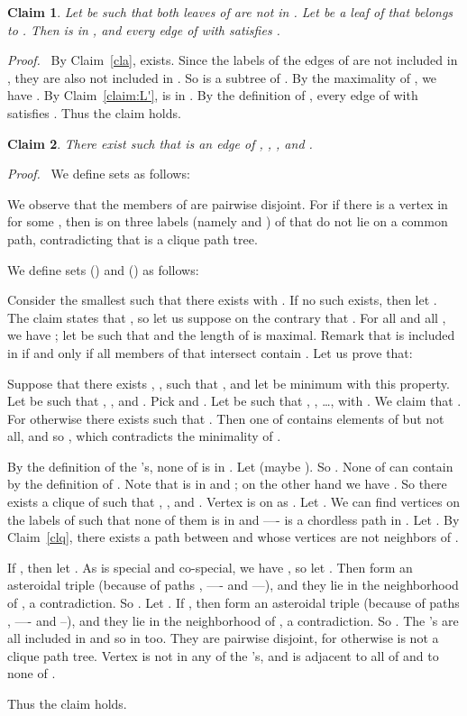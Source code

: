 \documentclass[11pt]{article}
\newtheorem{claim}{Claim}
\newenvironment{proofcl}{\noindent \emph{Proof.}\ }{Thus the claim
holds.  \hfill \vspace{1em}}
\begin{document}
\begin{claim}
\label{cl:orange}
Let  be such that both leaves of  are not in .
Let  be a leaf of  that belongs to .  Then
 is in , and every edge  of  with  satisfies .
\end{claim}
\begin{proofcl}
By Claim~\ref{cla},  exists.  Since the labels of the edges of
 are not included in , they are also not included in
.  So  is a subtree of .  By the maximality of
, we have .  By Claim~\ref{claim:L'},  is in
.  By the definition of , every edge  of  with
 satisfies .
\end{proofcl}

\begin{claim}
\label{claim:p}
There exist  such that
 is an edge of , , ,  and .
\end{claim}
\begin{proofcl}
We define sets  as follows:


We observe that the members of  are pairwise disjoint.
For if there is a vertex  in  for some , then  is on three labels (namely 
and ) of  that do not lie on a common path, contradicting
that  is a clique path tree.

We define sets  () and  () as follows:


Consider the smallest  such that there exists  with .  If no such  exists,
then let .  The claim states that , so let us suppose
on the contrary that .  For all  and all
, we have ; let  be such that  and the length of  is maximal.  Remark that  is included in  if and only
if all members of  that intersect  contain .
Let us prove that:


Suppose that there exists , ,
such that , and let  be minimum with this
property.  Let  be such that
, ,  and .  Pick  and .  Let  be such that , ,
\ldots,  with .  We claim that .  For otherwise there exists  such that .  Then one of 
contains elements of  but not all, and so , which contradicts the minimality of .

By the definition of the 's, none of 
is in .  Let  (maybe ).  So .  None of  can
contain  by the definition of .  Note that  is
in  and ; on the other hand we have .  So there exists a clique  of  such that
, ,  and .  Vertex  is on
 as .  Let .  We
can find vertices  on the labels of 
such that none of them is in  and ---- is
a chordless path in .  Let .  By
Claim~\ref{clq}, there exists a path  between  and  whose
vertices are not neighbors of .

If , then let .  As  is
special and co-special, we have , so let .  Then  form an asteroidal triple
(because of paths , ---- and
---), and they lie in the neighborhood of , a
contradiction.  So .  Let .
If , then  form an asteroidal triple
(because of paths , ---- and
--), and they lie in the neighborhood of , a
contradiction.  So .  The 's are all
included in  and so in  too.  They are pairwise disjoint, for
otherwise  is not a clique path tree.  Vertex  is not in
any of the 's, and  is adjacent to all of  and to none of .


\end{proofcl}
\end{document}
